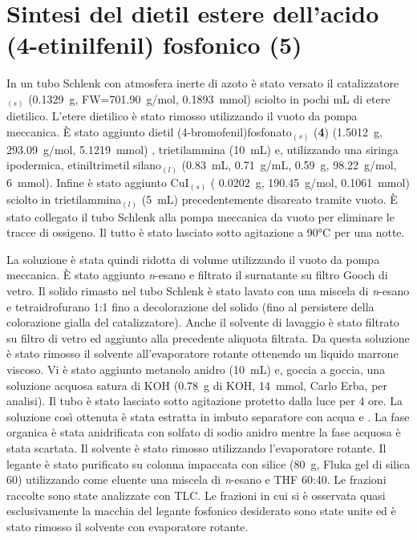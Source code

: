 \section{Sintesi del dietil estere dell'acido (4-etinilfenil) fosfonico (5)}
In un tubo Schlenk con atmosfera inerte di azoto è stato versato il catalizzatore $_{(s)}$ (0.1329~g, FW=701.90~g/mol, 0.1893~mmol) sciolto in pochi mL di etere dietilico. L'etere dietilico è stato rimosso utilizzando il vuoto da pompa meccanica. È stato aggiunto dietil (4-bromofenil)fosfonato$_{(s)}$ ({\bf 4}) (1.5012~g, 293.09~g/mol, 5.1219~mmol)
, trietilammina (10~mL) e, utilizzando una siringa ipodermica, etiniltrimetil silano$_{(l)}$ (0.83~mL, 0.71~g/mL, 0.59~g, 98.22~g/mol, 6~mmol). 
Infine è stato aggiunto CuI$_{(s)}$ ( 0.0202~g, 190.45~g/mol, 0.1061~mmol) sciolto in trietilammina$_{(l)}$ (5~mL) precedentemente disareato tramite vuoto. È stato collegato il tubo Schlenk alla pompa meccanica da vuoto per eliminare le tracce di ossigeno. Il tutto è stato lasciato sotto agitazione a 90°C per una notte.

La soluzione è stata quindi ridotta di volume utilizzando il vuoto da pompa meccanica. 
È stato aggiunto {\itshape n}-esano e filtrato il surnatante su filtro Gooch di vetro. Il solido rimasto nel tubo Schlenk è stato lavato con una miscela di {\itshape n}-esano  e tetraidrofurano 1:1 fino a decolorazione del solido (fino al persistere della colorazione gialla del catalizzatore). Anche il solvente di lavaggio è stato filtrato su filtro di vetro ed aggiunto alla precedente aliquota filtrata. Da questa soluzione è stato rimosso il solvente all'evaporatore rotante ottenendo un liquido marrone viscoso. Vi è stato aggiunto metanolo anidro (10~mL) e, goccia a goccia, una soluzione acquosa satura di KOH (0.78~g di KOH, 14~mmol, Carlo Erba, per analisi). Il tubo è stato lasciato sotto agitazione protetto dalla luce per 4 ore. La soluzione così ottenuta è stata estratta in imbuto separatore con acqua e . La fase organica è stata anidrificata con solfato di sodio anidro mentre la fase acquosa è stata scartata. Il solvente è stato rimosso utilizzando l'evaporatore rotante. Il legante è stato purificato su colonna impaccata con silice (80~g, Fluka gel di silica 60) utilizzando come eluente una miscela di {\itshape n}-esano  e THF 60:40. Le frazioni raccolte sono state analizzate con TLC\@. Le frazioni in cui si è osservata quasi esclusivamente la macchia del legante fosfonico desiderato sono state unite ed è stato rimosso il solvente con evaporatore rotante. 
 
